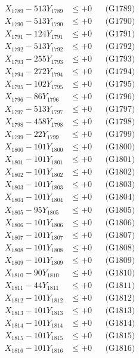 \documentclass[a4paper,10pt]{article}
\begin{document}
{\begin{align}
X_{1789} - 513Y_{1789} &\leq +0 && \text{(G1789)} \\
X_{1790} - 513Y_{1790} &\leq +0 && \text{(G1790)} \\
\allowbreak
X_{1791} - 124Y_{1791} &\leq +0 && \text{(G1791)} \\
X_{1792} - 513Y_{1792} &\leq +0 && \text{(G1792)} \\
X_{1793} - 255Y_{1793} &\leq +0 && \text{(G1793)} \\
X_{1794} - 272Y_{1794} &\leq +0 && \text{(G1794)} \\
X_{1795} - 102Y_{1795} &\leq +0 && \text{(G1795)} \\
X_{1796} - 86Y_{1796} &\leq +0 && \text{(G1796)} \\
X_{1797} - 513Y_{1797} &\leq +0 && \text{(G1797)} \\
X_{1798} - 458Y_{1798} &\leq +0 && \text{(G1798)} \\
X_{1799} - 22Y_{1799} &\leq +0 && \text{(G1799)} \\
X_{1800} - 101Y_{1800} &\leq +0 && \text{(G1800)} \\
\allowbreak
X_{1801} - 101Y_{1801} &\leq +0 && \text{(G1801)} \\
X_{1802} - 101Y_{1802} &\leq +0 && \text{(G1802)} \\
X_{1803} - 101Y_{1803} &\leq +0 && \text{(G1803)} \\
X_{1804} - 101Y_{1804} &\leq +0 && \text{(G1804)} \\
X_{1805} - 95Y_{1805} &\leq +0 && \text{(G1805)} \\
X_{1806} - 101Y_{1806} &\leq +0 && \text{(G1806)} \\
X_{1807} - 101Y_{1807} &\leq +0 && \text{(G1807)} \\
X_{1808} - 101Y_{1808} &\leq +0 && \text{(G1808)} \\
X_{1809} - 101Y_{1809} &\leq +0 && \text{(G1809)} \\
X_{1810} - 90Y_{1810} &\leq +0 && \text{(G1810)} \\
\allowbreak
X_{1811} - 44Y_{1811} &\leq +0 && \text{(G1811)} \\
X_{1812} - 101Y_{1812} &\leq +0 && \text{(G1812)} \\
X_{1813} - 101Y_{1813} &\leq +0 && \text{(G1813)} \\
X_{1814} - 101Y_{1814} &\leq +0 && \text{(G1814)} \\
X_{1815} - 101Y_{1815} &\leq +0 && \text{(G1815)} \\
X_{1816} - 101Y_{1816} &\leq +0 && \text{(G1816)} \\

\end{align}}
\end{document}
